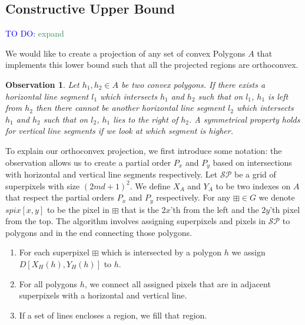 \documentclass[a4paper, UKenglish]{lipics-v2018}
\newtheorem{observation}{Observation}
\newcommand{\mremark}[3]{\textcolor{blue}{\textsc{#1 #2:}} \textcolor{SeaGreen}{\textsf{#3}}}
\newcommand{\todo}[2][DO]{\mremark{TO}{#1}{#2}}
\newcommand{\spg}{\mathcal{S\!P}}
\newcommand{\spix}{\boxplus}
\begin{document}

\subsection{Constructive Upper Bound}
\label{sub:convex_upper}

\todo{expand}

We would like to create a projection of any set of convex Polygons $A$ that implements this lower bound such that all the projected regions are orthoconvex.



\begin{observation}
Let $h_1,h_2 \in A$ be two convex polygons. If there exists a horizontal line segment $l_1$ which intersects $h_1$ and $h_2$ such that on $l_1$, $h_1$ is left from $h_2$ then there cannot be another horizontal line segment $l_2$ which intersects $h_1$ and $h_2$ such that on $l_2$, $h_1$ lies to the right of $h_2$. A symmetrical property holds for vertical line segments if we look at which segment is higher.
\end{observation}

To explain our orthoconvex projection, we first introduce some notation: the observation allows us to create a partial order $P_x$ and $P_y$ based on intersections with horizontal and vertical line segments respectively. Let $\spg$ be a grid of superpixels with size $(2md+1)^2$. We define $X_A$ and $Y_A$ to be two indexes on $A$ that respect the partial orders $P_x$ and $P_y$ respectively. For any $\spix \in G$ we denote $spix[x,y]$ to be the pixel in $\spix$ that is the $2x$'th from the left and the $2y$'th pixel from the top. The algorithm involves assigning superpixels and pixels in $\spg$ to polygons and in the end connecting those polygons.

\begin{enumerate}
\item For each superpixel $\spix$ which is intersected by a polygon $h$ we assign $D[X_H(h), Y_H(h)]$ to $h$.
\item For all polygons $h$, we connect all assigned pixels that are in adjacent superpixels with a horizontal and vertical line. 
\item If a set of lines encloses a region, we fill that region.
\end{enumerate}
\end{document}
